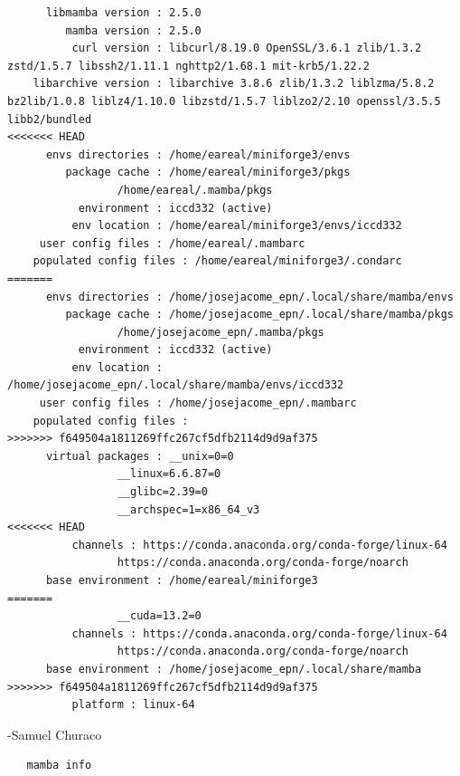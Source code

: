 \documentclass{article}
\begin{document}
\begin{enumerate}
\begin{verbatim}
	  libmamba version : 2.5.0
	     mamba version : 2.5.0
	      curl version : libcurl/8.19.0 OpenSSL/3.6.1 zlib/1.3.2 zstd/1.5.7 libssh2/1.11.1 nghttp2/1.68.1 mit-krb5/1.22.2
	libarchive version : libarchive 3.8.6 zlib/1.3.2 liblzma/5.8.2 bz2lib/1.0.8 liblz4/1.10.0 libzstd/1.5.7 liblzo2/2.10 openssl/3.5.5 libb2/bundled
<<<<<<< HEAD
	  envs directories : /home/eareal/miniforge3/envs
	     package cache : /home/eareal/miniforge3/pkgs
			     /home/eareal/.mamba/pkgs
	       environment : iccd332 (active)
	      env location : /home/eareal/miniforge3/envs/iccd332
	 user config files : /home/eareal/.mambarc
    populated config files : /home/eareal/miniforge3/.condarc
=======
	  envs directories : /home/josejacome_epn/.local/share/mamba/envs
	     package cache : /home/josejacome_epn/.local/share/mamba/pkgs
			     /home/josejacome_epn/.mamba/pkgs
	       environment : iccd332 (active)
	      env location : /home/josejacome_epn/.local/share/mamba/envs/iccd332
	 user config files : /home/josejacome_epn/.mambarc
    populated config files : 
>>>>>>> f649504a1811269ffc267cf5dfb2114d9d9af375
	  virtual packages : __unix=0=0
			     __linux=6.6.87=0
			     __glibc=2.39=0
			     __archspec=1=x86_64_v3
<<<<<<< HEAD
		  channels : https://conda.anaconda.org/conda-forge/linux-64
			     https://conda.anaconda.org/conda-forge/noarch
	  base environment : /home/eareal/miniforge3
=======
			     __cuda=13.2=0
		  channels : https://conda.anaconda.org/conda-forge/linux-64
			     https://conda.anaconda.org/conda-forge/noarch
	  base environment : /home/josejacome_epn/.local/share/mamba
>>>>>>> f649504a1811269ffc267cf5dfb2114d9d9af375
		  platform : linux-64
\end{verbatim}

-Samuel Churaco
\begin{verbatim}
   mamba info
\end{verbatim}

\begin{verbatim}


\end{verbatim}
\end{enumerate}
\end{document}
